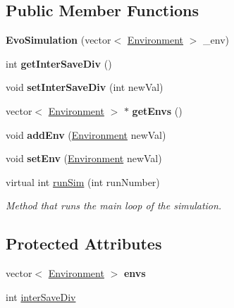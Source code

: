 \subsection*{Public Member Functions}
\begin{DoxyCompactItemize}
\item 
\hypertarget{classEvoSimulation_ad9c067c5d931cef3485671c652340fed}{}\label{classEvoSimulation_ad9c067c5d931cef3485671c652340fed} 
{\bfseries Evo\+Simulation} (vector$<$ \hyperlink{classEnvironment}{Environment} $>$ \+\_\+env)
\item 
\hypertarget{classEvoSimulation_ad355ec692640389831d0f70ee5336371}{}\label{classEvoSimulation_ad355ec692640389831d0f70ee5336371} 
int {\bfseries get\+Inter\+Save\+Div} ()
\item 
\hypertarget{classEvoSimulation_afcd50bb904037e0ed92f82db5bce4706}{}\label{classEvoSimulation_afcd50bb904037e0ed92f82db5bce4706} 
void {\bfseries set\+Inter\+Save\+Div} (int new\+Val)
\item 
\hypertarget{classEvoSimulation_abc143157a5ee313cd04375e0b11fd25d}{}\label{classEvoSimulation_abc143157a5ee313cd04375e0b11fd25d} 
vector$<$ \hyperlink{classEnvironment}{Environment} $>$ $\ast$ {\bfseries get\+Envs} ()
\item 
\hypertarget{classEvoSimulation_ae2c4e68c8181696f5c524c9f09f29421}{}\label{classEvoSimulation_ae2c4e68c8181696f5c524c9f09f29421} 
void {\bfseries add\+Env} (\hyperlink{classEnvironment}{Environment} new\+Val)
\item 
\hypertarget{classEvoSimulation_ae075e1877fb4c1132f4630a85ed5fcbf}{}\label{classEvoSimulation_ae075e1877fb4c1132f4630a85ed5fcbf} 
void {\bfseries set\+Env} (\hyperlink{classEnvironment}{Environment} new\+Val)
\item 
virtual int \hyperlink{classEvoSimulation_aa43aa351dec24c638e56995a67a4f0f5}{run\+Sim} (int run\+Number)
\begin{DoxyCompactList}\small\item\em Method that runs the main loop of the simulation. \end{DoxyCompactList}\end{DoxyCompactItemize}
\subsection*{Protected Attributes}
\begin{DoxyCompactItemize}
\item 
\hypertarget{classEvoSimulation_ac75fd2b2c9fb588adb138c0c0aaebe4d}{}\label{classEvoSimulation_ac75fd2b2c9fb588adb138c0c0aaebe4d} 
vector$<$ \hyperlink{classEnvironment}{Environment} $>$ {\bfseries envs}
\item 
int \hyperlink{classEvoSimulation_aced0330991a4c4ed3bf726e5909fbd31}{inter\+Save\+Div}
\end{DoxyCompactItemize}


